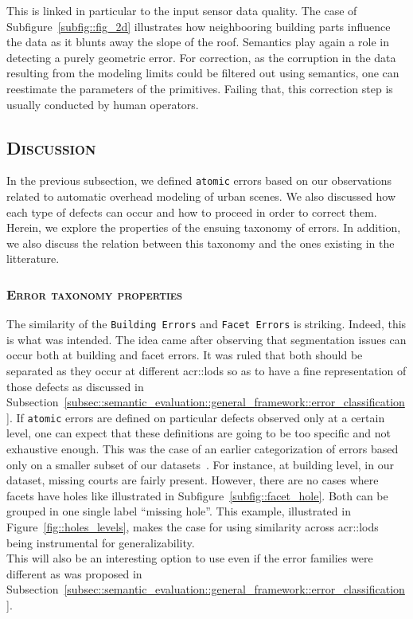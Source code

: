                 This is linked in particular to the input sensor data quality.
                The case of Subfigure~\ref{subfig::fig_2d} illustrates how neighbooring building parts influence the data as it blunts away the slope of the roof.
                Semantics play again a role in detecting a purely geometric error.
                For correction, as the corruption in the data resulting from the modeling limits could be filtered out using semantics, one can reestimate the parameters of the primitives.
                Failing that, this correction step is usually conducted by human operators.

    \subsection{\textsc{Discussion}}
        \label{subsec::semantic_evaluation::overhead::discussion}

        In the previous subsection, we defined \texttt{atomic} errors based on our observations related to automatic overhead modeling of urban scenes.
        We also discussed how each type of defects can occur and how to proceed in order to correct them.
        Herein, we explore the properties of the ensuing taxonomy of errors.
        In addition, we also discuss the relation between this taxonomy and the ones existing in the litterature.

        \subsubsection{\textsc{Error taxonomy properties}}
            The similarity of the \texttt{Building Errors} and \texttt{Facet Errors} is striking.
            Indeed, this is what was intended.
            The idea came after observing that segmentation issues can occur both at building and facet errors.
            It was ruled that both should be separated as they occur at different \glspl{acr::lod} so as to have a fine representation of those defects as discussed in Subsection~\ref{subsec::semantic_evaluation::general_framework::error_classification}.
            If \texttt{atomic} errors are defined on particular defects observed only at a certain level, one can expect that these definitions are going to be too specific and not exhaustive enough.
            This was the case of an earlier categorization of errors based only on a smaller subset of our datasets~\parencite{ennafii2018semantic}.
            For instance, at building level, in our dataset, missing courts are fairly present.
            However, there are no cases where facets have holes like illustrated in Subfigure~\ref{subfig::facet_hole}.
            Both can be grouped in one single label ``missing hole''.
            This example, illustrated in Figure~\ref{fig::holes_levels}, makes the case for using similarity across \glspl{acr::lod} being instrumental for generalizability.\\
            This will also be an interesting option to use even if the error families were different as was proposed in Subsection~\ref{subsec::semantic_evaluation::general_framework::error_classification}.\\

